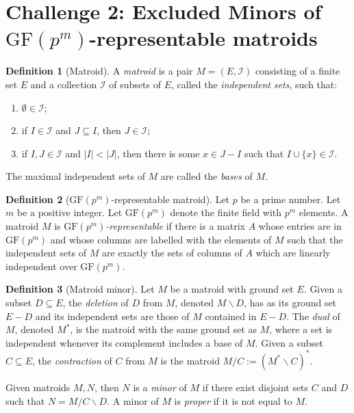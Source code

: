 \documentclass[12pt]{article}
\numberwithin{equation}{section}
\theoremstyle{definition}
\newtheorem{definition}{Definition}
\begin{document}
\section*{Challenge 2: Excluded Minors of $\mathrm{GF}(p^m)$-representable matroids}

\begin{definition}[Matroid]
A \emph{matroid} is a pair $M=(E,\mathcal I)$ consisting of a finite set $E$ and a collection $\mathcal I$ of subsets of $E$, called the \emph{independent sets}, such that:
\begin{enumerate}
\item $\emptyset \in \mathcal I$;
\item if $I\in \mathcal I$ and $J\subseteq I$, then $J\in \mathcal I$;
\item if $I,J\in \mathcal I$ and $|I|<|J|$, then there is some $x\in J- I$ such that $I\cup \{x\}\in \mathcal I$.
\end{enumerate}
The maximal independent sets of $M$ are called the \emph{bases} of $M$.
\end{definition}

\begin{definition}[$\mathrm{GF}(p^m)$-representable matroid]
Let $p$ be a prime number. Let $m$ be a positive integer. Let $\mathrm{GF}(p^m)$ denote the finite field with $p^m$ elements. A matroid $M$ is \emph{$\mathrm{GF}(p^m)$-representable} if there is a matrix $A$  whose entries are in $\mathrm{GF}(p^m)$ and whose columns are labelled with the elements of $M$ such that the independent sets of $M$ are exactly the sets of columns of $A$ which are linearly independent over $\mathrm{GF}(p^m)$.
\end{definition}

\begin{definition}[Matroid minor]
Let $M$ be a matroid with ground set $E$. 
Given a subset $D \subseteq E$, the \emph{deletion} of $D$ from $M$, denoted $M\backslash D$, has as its ground set $E- D$ and its independent sets are those of $M$ contained in $E- D$.
The \textit{dual} of $M$, denoted $M^*$, is the matroid with the same ground set as $M$, where a set is independent whenever its complement includes a base of $M$.  Given a subset $C\subseteq E$, the \emph{contraction} of $C$ from $M$ is the matroid $M/C := (M^*\backslash C)^*$.

Given matroids $M,N$, then $N$ is a \emph{minor} of $M$ if there exist disjoint sets $C$ and $D$ such that $N = M/C\backslash D$. A minor of $M$ is \textit{proper} if it is not equal to $M$.
\end{definition}
\end{document}
